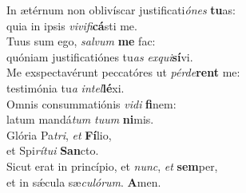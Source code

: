 \oddverse In ætérnum non oblivíscar justificati\textit{ó}\textit{nes} \textbf{tu}as:~\*\\
\oddverse quia in ipsis \textit{vi}\textit{vi}\textit{fi}\textbf{cá}sti me.\\
\evenverse Tuus sum ego, \textit{sal}\textit{vum} \textbf{me} fac:~\*\\
\evenverse quóniam justificatiónes tu\textit{as} \textit{ex}\textit{qui}\textbf{sí}vi.\\
\oddverse Me exspectavérunt peccatóres ut \textit{pér}\textit{de}\textbf{rent} me:~\*\\
\oddverse testimónia tu\textit{a} \textit{in}\textit{tel}\textbf{lé}xi.\\
\evenverse Omnis consummatiónis \textit{vi}\textit{di} \textbf{fi}nem:~\*\\
\evenverse latum mandá\textit{tum} \textit{tu}\textit{um} \textbf{ni}mis.\\
\oddverse Glória Pa\textit{tri}, \textit{et} \textbf{Fí}lio,~\*\\
\oddverse et Spi\textit{rí}\textit{tu}\textit{i} \textbf{San}cto.\\
\evenverse Sicut erat in princípio, et \textit{nunc}, \textit{et} \textbf{sem}per,~\*\\
\evenverse et in sǽcula sæ\textit{cu}\textit{ló}\textit{rum}. \textbf{A}men.\\
